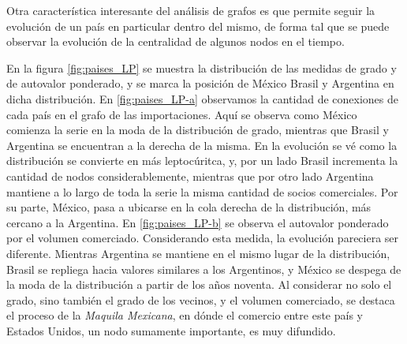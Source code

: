 \documentclass[a4paper]{article}
\begin{document}
Otra característica interesante del análisis de grafos es que permite seguir la evolución de un país en particular dentro del mismo, de forma tal que se puede observar la evolución de la centralidad de algunos nodos en el tiempo. \par
En la figura \ref{fig:paises_LP} se muestra la distribución de las medidas de grado y de autovalor ponderado, y se marca la posición de México Brasil y Argentina en dicha distribución. 
En \ref{fig:paises_LP-a} observamos la cantidad de conexiones de cada país en el grafo de las importaciones. Aquí se observa como México comienza la serie en la moda de la distribución de grado, mientras que Brasil y Argentina se encuentran a la derecha de la misma. En la evolución se vé como la distribución se convierte en más leptocúritca, y, por un lado Brasil incrementa la cantidad de nodos considerablemente, mientras que por otro lado Argentina mantiene a lo largo de toda la serie la misma cantidad de socios comerciales. Por su parte, México, pasa a ubicarse en la cola derecha de la distribución, más cercano a la Argentina. 
En \ref{fig:paises_LP-b} se observa el autovalor ponderado por el volumen comerciado. Considerando esta medida, la evolución pareciera ser diferente. Mientras Argentina se mantiene en el mismo lugar de la distribución, Brasil se repliega hacia valores similares a los Argentinos, y México se despega de la moda de la distribución a partir de los años noventa. Al considerar no solo el grado, sino también el grado de los vecinos, y el volumen comerciado, se destaca el proceso de la \textit{Maquila Mexicana}, en dónde el comercio entre este país y Estados Unidos, un nodo sumamente importante, es muy difundido. 
\end{document}
